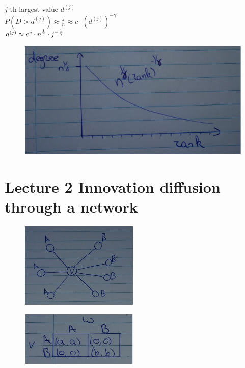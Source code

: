 \documentclass[12pt]{scrartcl}
\begin{document}
\noindent $j$-th largest value $d^{(j)}$\\
$P(D>d^{(j)}) \approx \frac{j}{n} \approx c\cdot (d^{(j)})^{-\gamma}$\\
$d^{(j)} \approx c"\cdot n^{\frac{1}{\gamma}}\cdot j^{-\frac{1}{\gamma}}$

\begin{figure}[h]
	\centering
	\includegraphics[width=\textwidth]{./images/fig_2.jpg}
\end{figure}


\clearpage
\section{Lecture 2 Innovation diffusion through a network} 

\begin{figure}[h]
	\centering
	\includegraphics[width=0.5\textwidth]{./images/fig1.jpg}
 
\end{figure}

\begin{figure}[h]
	\centering
	\includegraphics[width=0.5\textwidth]{./images/fig2.jpg}
  
\end{figure}
\end{document}
